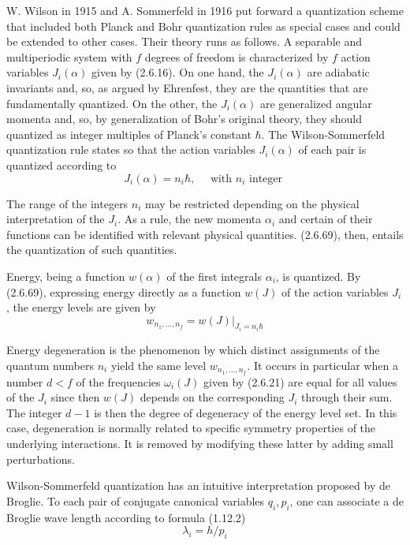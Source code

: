\documentclass{article}
\begin{document}
W. Wilson in 1915 and A. Sommerfeld in 1916 put forward a quantization scheme that included both Planck and Bohr quantization rules as special cases and could be extended to other cases. Their theory runs as follows. A separable and multiperiodic system with $f$ degrees of freedom is characterized by $f$ action variables $J_{i}(\alpha)$ given by (2.6.16). On one hand, the $J_{i}(\alpha)$ are adiabatic invariants and, so, as argued by Ehrenfest, they are the quantities that are fundamentally quantized. On the other, the $J_{i}(\alpha)$ are generalized angular momenta and, so, by generalization of Bohr's original theory, they should quantized as integer multiples of Planck's constant $\hbar$. The Wilson-Sommerfeld quantization rule states so that the action variables $J_{i}(\alpha)$ of each pair is quantized according to
$$
\begin{equation*}
J_{i}(\alpha)=n_{i} \hbar, \quad \text { with } n_{i} \text { integer } \tag{2.6.69}
\end{equation*}
$$

The range of the integers $n_{i}$ may be restricted depending on the physical interpretation of the $J_{i}$. As a rule, the new momenta $\alpha_{i}$ and certain of their functions can be identified with relevant physical quantities. (2.6.69), then, entails the quantization of such quantities.

Energy, being a function $w(\alpha)$ of the first integrals $\alpha_{i}$, is quantized. By (2.6.69), expressing energy directly as a function $w(J)$ of the action variables $J_{i}$, the energy levels are given by
$$
\begin{equation*}
w_{n_{1}, \ldots, n_{f}}=\left.w(J)\right|_{J_{i}=n_{i} \hbar} \tag{2.6.70}
\end{equation*}
$$

Energy degeneration is the phenomenon by which distinct assignments of the quantum numbers $n_{i}$ yield the same level $w_{n_{1}, \ldots, n_{f}}$. It occurs in particular when a number $d<f$ of the frequencies $\omega_{i}(J)$ given by (2.6.21) are equal for all values of the $J_{i}$ since then $w(J)$ depends on the corresponding $J_{i}$ through their sum. The integer $d-1$ is then the degree of degeneracy of the energy level set. In this case, degeneration is normally related to specific symmetry properties of the underlying interactions. It is removed by modifying these latter by adding small perturbations.

Wilson-Sommerfeld quantization has an intuitive interpretation proposed by de Broglie. To each pair of conjugate canonical variables $q_{i}, p_{i}$, one can associate a de Broglie wave length according to formula (1.12.2)
$$
\begin{equation*}
\lambda_{i}=h / p_{i} \tag{2.6.71}
\end{equation*}
$$
\end{document}
